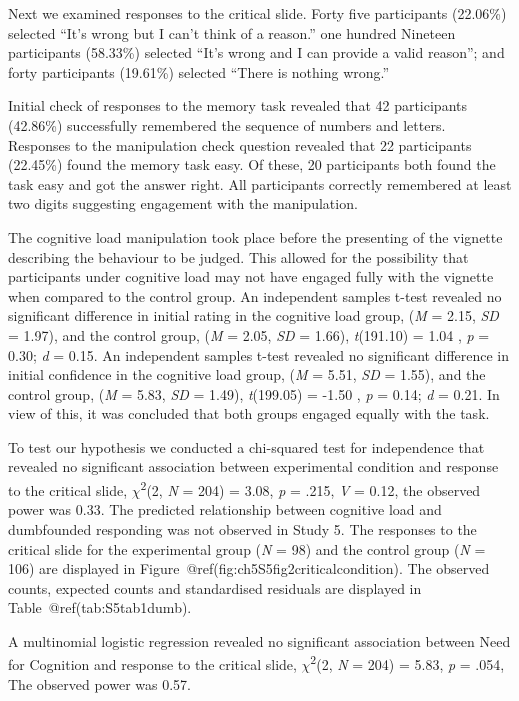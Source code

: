 \documentclass[
  american,
  man,floatsintext]{apa7}
\begin{document}
Next we examined responses to the critical slide. Forty five participants (22.06\%) selected ``It's wrong but I can't think of a reason.'' one hundred Nineteen participants (58.33\%) selected ``It's wrong and I can provide a valid reason''; and forty participants (19.61\%) selected ``There is nothing wrong.''

Initial check of responses to the memory task revealed that 42 participants (42.86\%) successfully remembered the sequence of numbers and letters. Responses to the manipulation check question revealed that 22 participants (22.45\%) found the memory task easy. Of these, 20 participants both found the task easy and got the answer right. All participants correctly remembered at least two digits suggesting engagement with the manipulation.

The cognitive load manipulation took place before the presenting of the vignette describing the behaviour to be judged. This allowed for the possibility that participants under cognitive load may not have engaged fully with the vignette when compared to the control group. An independent samples t-test revealed no significant difference in initial rating in the cognitive load group, (\emph{M} = 2.15, \emph{SD} = 1.97), and the control group, (\emph{M} = 2.05, \emph{SD} = 1.66), \emph{t}(191.10) = 1.04 , \emph{p} = 0.30; \emph{d} = 0.15. An independent samples t-test revealed no significant difference in initial confidence in the cognitive load group, (\emph{M} = 5.51, \emph{SD} = 1.55), and the control group, (\emph{M} = 5.83, \emph{SD} = 1.49), \emph{t}(199.05) = -1.50 , \emph{p} = 0.14; \emph{d} = 0.21. In view of this, it was concluded that both groups engaged equally with the task.

To test our hypothesis we conducted a chi-squared test for independence that revealed no significant association between experimental condition and response to the critical slide, \(\chi\)\textsuperscript{2}(2, \emph{N} = 204) = 3.08, \emph{p} = .215, \emph{V} = 0.12, the observed power was 0.33. The predicted relationship between cognitive load and dumbfounded responding was not observed in Study 5. The responses to the critical slide for the experimental group (\emph{N} = 98) and the control group (\emph{N} = 106) are displayed in Figure~@ref(fig:ch5S5fig2criticalcondition). The observed counts, expected counts and standardised residuals are displayed in Table~@ref(tab:S5tab1dumb).

A multinomial logistic regression revealed no significant association between Need for Cognition and response to the critical slide, \(\chi\)\textsuperscript{2}(2, \emph{N} = 204) = 5.83, \emph{p} = .054, The observed
power was 0.57.
\end{document}
